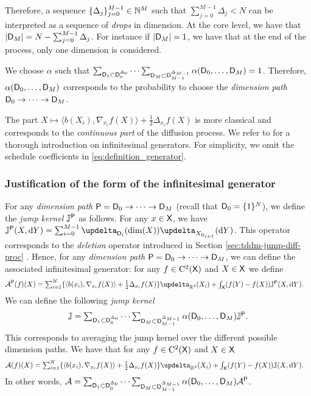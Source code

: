 Therefore, a sequence $\{\Delta_j\}_{j=0}^{M-1} \in \mathbb{N}^{M}$ such that
$\sum_{j=0}^{M-1} \Delta_j < N$ can be interpreted as a sequence of
\emph{drops} in dimension. At the core level, we have that
$|\mathsf{D}_M| = N - \sum_{j=0}^{M-1} \Delta_j$. For instance if
$|\mathsf{D}_M| = 1$, we have that at the end of the process, only one dimension
is considered.

We choose $\alpha$ such that
$\sum_{\mathsf{D}_1 \subset \mathsf{D}_0^{\Delta_0}} \dots \sum_{\mathsf{D}_M \subset
  \mathsf{D}_{M-1}^{\Delta_{M-1}}} \alpha(\mathsf{D}_0, \dots, \mathsf{D}_M) = 1$. Therefore,
$\alpha(\mathsf{D}_0, \dots, \mathsf{D}_M)$ corresponds to the probability to choose the
\emph{dimension path} $\mathsf{D}_0 \to \dots \to \mathsf{D}_M$.

The part
$X \mapsto \langle b(X_i), \nabla_{x_i}f(X) \rangle + \tfrac{1}{2} \Delta_{x_i}f(X)$ is
more classical and corresponds to the \emph{continuous part} of the diffusion
process. We refer to \cite{ethier2009markov} for a thorough introduction on
infinitesimal generators. For simplicity, we omit the schedule coefficients in
\eqref{eq:definition_generator}.

\subsubsection{Justification of the form of the infinitesimal generator}
\label{sec:tddm-just-form-infin}

For any \emph{dimension path} $\mathsf{P} = \mathsf{D}_0 \to \dots \to \mathsf{D}_M$ (recall that
$\mathsf{D}_0 = \{1\}^N$), we define the \emph{jump kernel} $\mathbb{J}^{\mathsf{P}}$ as
follows. For any $x \in \mathsf{X}$, we have
$\Jbb^\msp(X, \rmd Y) = \sum_{i=0}^{M-1} \updelta_{\msd_i}(\dim(X))
\updelta_{X_{\msd_{i+1}}}(\rmd Y)$. This operator corresponds to the \emph{deletion}
operator introduced in Section \ref{sec:tddm-jump-diff-proc} . Hence, for any \emph{dimension
  path} $\mathsf{P} = \mathsf{D}_0 \to \dots \to \mathsf{D}_M$, we can define the associated
infinitesimal generator: for any $f \in \mathrm{C}^2(\mathsf{X})$ and $X \in \mathsf{X}$ we define
\begin{align}
  \calA^\msp(f)(X) &\textstyle= \sum_{i=1}^N \{ \langle b(x_i), \nabla_{x_i}f(X) \rangle + \tfrac{1}{2} \Delta_{x_i}f(X)\} \updelta_{\rset^d}(X_i) + \int_{\msx}(f(Y) - f(X))\Jbb^\msp(X, \rmd Y) .
\end{align}
We can define the following \emph{jump kernel}
\begin{equation}
  \textstyle \mathbb{J} = \sum_{\mathsf{D}_1 \subset \mathsf{D}_0^{\Delta_0}} \dots  \sum_{\mathsf{D}_M \subset \mathsf{D}_{M-1}^{\Delta_{M-1}}} \alpha(\mathsf{D}_0, \dots, \mathsf{D}_M) \mathbb{J}^{\mathsf{P}} .
\end{equation}
This corresponds to averaging the jump kernel over the different possible
dimension paths. We have that for any $f \in \mathrm{C}^2(\mathsf{X})$ and $X \in \mathsf{X}$
\begin{align}
  \label{eq:inf_gen_tot}
  \calA(f)(X) &\textstyle= \sum_{i=1}^N \{ \langle b(x_i), \nabla_{x_i}f(X) \rangle + \tfrac{1}{2} \Delta_{x_i}f(X)\} \updelta_{\rset^d}(X_i) + \int_{\msx}(f(Y) - f(X))\Jbb(X, \rmd Y) .
\end{align}
In other words,
$\mathcal{A} = \sum_{\mathsf{D}_1 \subset \mathsf{D}_0^{\Delta_0}} \dots \sum_{\mathsf{D}_M \subset
  \mathsf{D}_{M-1}^{\Delta_{M-1}}} \alpha(\mathsf{D}_0, \dots, \mathsf{D}_M) \mathcal{A}^{\mathsf{P}}$.

